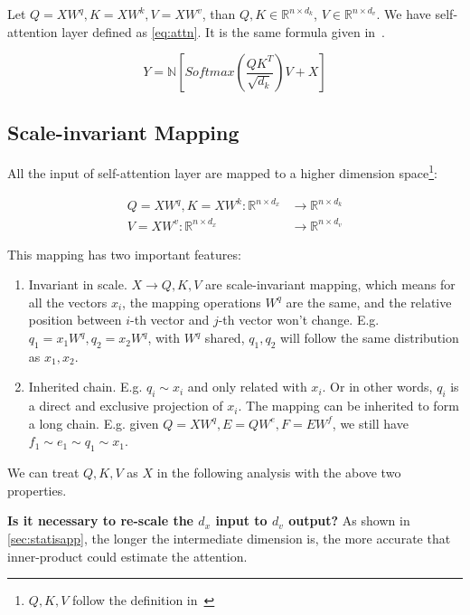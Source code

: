 \documentclass[final]{cvpr}
\begin{document}
Let $Q=XW^q, K=XW^k, V=XW^v$, than $Q,K\in\mathbb{R}^{n\times{d_k}}$, $V\in\mathbb{R}^{n\times{d_v}}$. We have self-attention layer defined as \autoref{eq:attn}. It is the same formula given in~\cite{vaswani2017attention}.

\begin{equation}
    Y=\mathbb{N}\left[Softmax\left(\frac{QK^T}{\sqrt{d_k}}\right)V+X\right]\label{eq:attn}
\end{equation}
    

\subsection{Scale-invariant Mapping}
\label{sec:simap}

All the input of self-attention layer are mapped to a higher dimension space\footnote{$Q,K,V$ follow the definition in~\cite{vaswani2017attention}}:

\begin{align}
    Q=XW^q,K=XW^k: \mathbb{R}^{n\times{d_x}}&\to\mathbb{R}^{n\times{d_k}}\\
    V=XW^v: \mathbb{R}^{n\times{d_x}}&\to\mathbb{R}^{n\times{d_v}}
\end{align}

This mapping has two important features:

\begin{enumerate}
    \item Invariant in scale. $X\to Q,K,V$ are scale-invariant mapping, which means for all the vectors $x_i$, the mapping operations $W^{q}$ are the same, and the relative position between $i$-th vector and $j$-th vector won't change. E.g. $q_1=x_1W^q, q_2=x_2W^q$, with $W^q$ shared, $q_1, q_2$ will follow the same distribution as $x_1, x_2$.
    \item Inherited chain. E.g. $q_i\sim x_i$ and only related with $x_i$. Or in other words, $q_i$ is a direct and exclusive projection of $x_i$. The mapping can be inherited to form a long chain. E.g. given $Q=XW^q, E=QW^e, F=EW^f$, we still have $f_1\sim e_1\sim q_1\sim x_1$.
\end{enumerate}

We can treat $Q,K,V$ as $X$ in the following analysis with the above two properties.

\textbf{Is it necessary to re-scale the $d_x$ input to $d_v$ output?}
As shown in \autoref{sec:statisapp}, the longer the intermediate dimension is, the more accurate that inner-product could estimate the attention.
\end{document}
